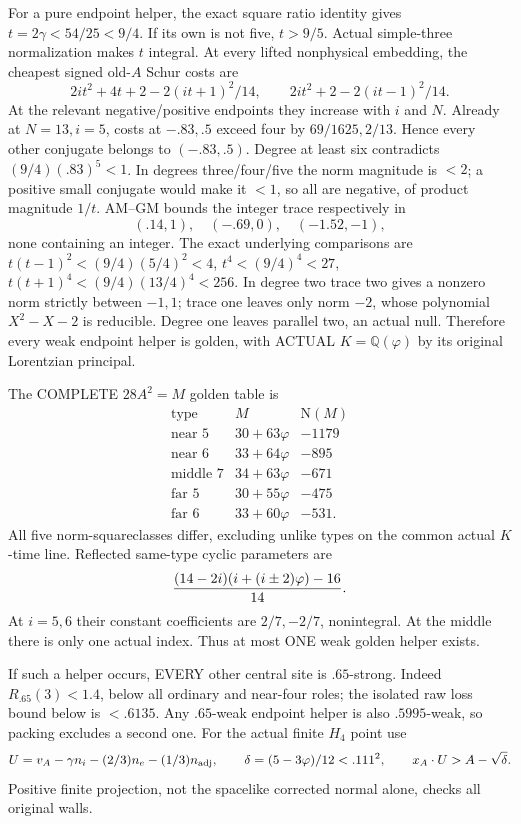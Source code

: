 For a pure endpoint helper, the exact square
ratio identity gives \(t=2\gamma<54/25<9/4\).
If its own is not five, \(t>9/5\).
Actual simple-three normalization makes \(t\)
integral.
At every lifted nonphysical embedding, the
cheapest signed old-\(A\) Schur costs are
\[
 2it^2+4t+2-2(it+1)^2/14,\qquad
 2it^2+2-2(it-1)^2/14 .
\]
At the relevant negative/positive endpoints
they increase with \(i\) and \(N\).
Already at \(N=13,i=5\), costs at \(-.83,.5\)
exceed four by \(69/1625,2/13\).
Hence every other conjugate belongs to
\((-.83,.5)\).
Degree at least six contradicts
\((9/4)(.83)^5<1\).
In degrees three/four/five the norm magnitude
is \(<2\); a positive small conjugate would
make it \(<1\), so all are negative, of product
magnitude \(1/t\).
AM--GM bounds the integer trace respectively in
\[
                         (.14,1),\quad(-.69,0),\quad(-1.52,-1),
\]
none containing an integer.
The exact underlying comparisons are
\(t(t-1)^2<(9/4)(5/4)^2<4\),
\(t^4<(9/4)^4<27\),
\(t(t+1)^4<(9/4)(13/4)^4<256\).
In degree two trace two gives a nonzero norm
strictly between \(-1,1\);
trace one leaves only norm \(-2\), whose
polynomial \(X^2-X-2\) is reducible.
Degree one leaves parallel two, an actual null.
Therefore every weak endpoint helper is golden,
with ACTUAL \(K=\mathbb Q(\varphi)\) by its
original Lorentzian principal.

The COMPLETE \(28A^2=M\) golden table is
\[
\begin{array}{c|c|r}
 \text{type}&M&\mathrm N(M)\\ \hline
 \text{near }5&30+63\varphi&-1179\\
 \text{near }6&33+64\varphi&-895\\
 \text{middle }7&34+63\varphi&-671\\
 \text{far }5&30+55\varphi&-475\\
 \text{far }6&33+60\varphi&-531 .
\end{array}
\]
All five norm-squareclasses differ, excluding
unlike types on the common actual \(K\)-time line.
Reflected same-type cyclic parameters are
\[
                  { (14-2i)(i+(i\pm2)\varphi)-16\over14}.
\]
At \(i=5,6\) their constant coefficients are
\(2/7,-2/7\), nonintegral.
At the middle there is only one actual index.
Thus at most ONE weak golden helper exists.

If such a helper occurs, EVERY other central
site is \(.65\)-strong.
Indeed \(R_{.65}(3)<1.4\), below all ordinary
and near-four roles; the isolated raw loss
bound below is \(<.6135\).
Any \(.65\)-weak endpoint helper is also
\(.5995\)-weak, so packing excludes a second one.
For the actual finite \(H_4\) point use
\[
 U=v_A-\gamma n_i-(2/3)n_e-(1/3)n_{\rm adj},
 \qquad\delta=(5-3\varphi)/12<.111^2,
 \qquad x_A\cdot U>A-\sqrt\delta .
\]
Positive finite projection, not the spacelike
corrected normal alone, checks all original
walls.

